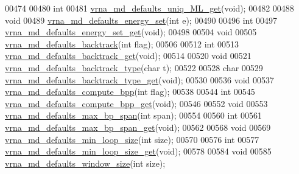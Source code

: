 \begin{DoxyCode}
00474 
00480 \textcolor{keywordtype}{int}
00481 \hyperlink{group__model__details_gab48e70fd024bf838404bcbcca0c874a0}{vrna\_md\_defaults\_uniq\_ML\_get}(\textcolor{keywordtype}{void});
00482 
00488 \textcolor{keywordtype}{void}
00489 \hyperlink{group__model__details_ga8dd29c55787a4576277e1907e92d810c}{vrna\_md\_defaults\_energy\_set}(\textcolor{keywordtype}{int} e);
00490 
00496 \textcolor{keywordtype}{int}
00497 \hyperlink{group__model__details_ga017ed6afb1cba2b7f242412cab618b53}{vrna\_md\_defaults\_energy\_set\_get}(\textcolor{keywordtype}{void});
00498 
00504 \textcolor{keywordtype}{void}
00505 \hyperlink{group__model__details_ga978c468b2fe96a70d5191e3dd17d5599}{vrna\_md\_defaults\_backtrack}(\textcolor{keywordtype}{int} flag);
00506 
00512 \textcolor{keywordtype}{int}
00513 \hyperlink{group__model__details_ga90da1156e6883ddd68527c2830706648}{vrna\_md\_defaults\_backtrack\_get}(\textcolor{keywordtype}{void});
00514 
00520 \textcolor{keywordtype}{void}
00521 \hyperlink{group__model__details_ga68305274de96b56b7799575e222560d8}{vrna\_md\_defaults\_backtrack\_type}(\textcolor{keywordtype}{char} t);
00522 
00528 \textcolor{keywordtype}{char}
00529 \hyperlink{group__model__details_ga1425b4ebd0e034dead66d79becd64143}{vrna\_md\_defaults\_backtrack\_type\_get}(\textcolor{keywordtype}{void});
00530 
00536 \textcolor{keywordtype}{void}
00537 \hyperlink{group__model__details_gaf1b5db10f1f476767f9a95f8a78e3132}{vrna\_md\_defaults\_compute\_bpp}(\textcolor{keywordtype}{int} flag);
00538 
00544 \textcolor{keywordtype}{int}
00545 \hyperlink{group__model__details_gaa3a537e61fbe0518673bf9f73fd820f3}{vrna\_md\_defaults\_compute\_bpp\_get}(\textcolor{keywordtype}{void});
00546 
00552 \textcolor{keywordtype}{void}
00553 \hyperlink{group__model__details_ga4c4bc962f09b4480cb8499f1cf8ae4ec}{vrna\_md\_defaults\_max\_bp\_span}(\textcolor{keywordtype}{int} span);
00554 
00560 \textcolor{keywordtype}{int}
00561 \hyperlink{group__model__details_gaa60f989e062fecd4d4bac89c1883da85}{vrna\_md\_defaults\_max\_bp\_span\_get}(\textcolor{keywordtype}{void});
00562 
00568 \textcolor{keywordtype}{void}
00569 \hyperlink{group__model__details_gac152f1e78c1058a10261022c8dfda0f7}{vrna\_md\_defaults\_min\_loop\_size}(\textcolor{keywordtype}{int} size);
00570 
00576 \textcolor{keywordtype}{int}
00577 \hyperlink{group__model__details_ga5cc691174a75c652807dc361b617632a}{vrna\_md\_defaults\_min\_loop\_size\_get}(\textcolor{keywordtype}{void});
00578 
00584 \textcolor{keywordtype}{void}
00585 \hyperlink{group__model__details_ga7b802ce0e8c3181bf5cb580de6d5b26a}{vrna\_md\_defaults\_window\_size}(\textcolor{keywordtype}{int} size);

\end{DoxyCode}
